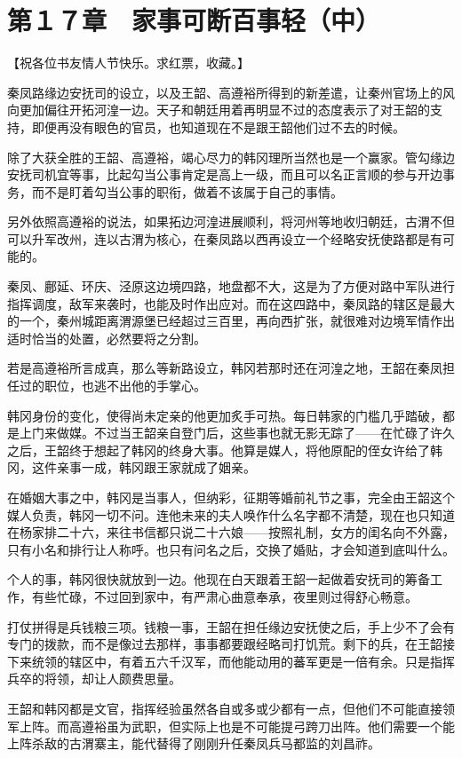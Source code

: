 \section{第１７章　家事可断百事轻（中）}

【祝各位书友情人节快乐。求红票，收藏。】

秦凤路缘边安抚司的设立，以及王韶、高遵裕所得到的新差遣，让秦州官场上的风向更加偏往开拓河湟一边。天子和朝廷用着再明显不过的态度表示了对王韶的支持，即便再没有眼色的官员，也知道现在不是跟王韶他们过不去的时候。

除了大获全胜的王韶、高遵裕，竭心尽力的韩冈理所当然也是一个赢家。管勾缘边安抚司机宜等事，比起勾当公事肯定是高上一级，而且可以名正言顺的参与开边事务，而不是盯着勾当公事的职衔，做着不该属于自己的事情。

另外依照高遵裕的说法，如果拓边河湟进展顺利，将河州等地收归朝廷，古渭不但可以升军改州，连以古渭为核心，在秦凤路以西再设立一个经略安抚使路都是有可能的。

秦凤、鄜延、环庆、泾原这边境四路，地盘都不大，这是为了方便对路中军队进行指挥调度，敌军来袭时，也能及时作出应对。而在这四路中，秦凤路的辖区是最大的一个，秦州城距离渭源堡已经超过三百里，再向西扩张，就很难对边境军情作出适时恰当的处置，必然要将之分割。

若是高遵裕所言成真，那么等新路设立，韩冈若那时还在河湟之地，王韶在秦凤担任过的职位，也逃不出他的手掌心。

韩冈身份的变化，使得尚未定亲的他更加炙手可热。每日韩家的门槛几乎踏破，都是上门来做媒。不过当王韶亲自登门后，这些事也就无影无踪了——在忙碌了许久之后，王韶终于想起了韩冈的终身大事。他算是媒人，将他原配的侄女许给了韩冈，这件亲事一成，韩冈跟王家就成了姻亲。

在婚姻大事之中，韩冈是当事人，但纳彩，征期等婚前礼节之事，完全由王韶这个媒人负责，韩冈一切不问。连他未来的夫人唤作什么名字都不清楚，现在也只知道在杨家排二十六，来往书信都只说二十六娘——按照礼制，女方的闺名向不外露，只有小名和排行让人称呼。也只有问名之后，交换了婚贴，才会知道到底叫什么。

个人的事，韩冈很快就放到一边。他现在白天跟着王韶一起做着安抚司的筹备工作，有些忙碌，不过回到家中，有严肃心曲意奉承，夜里则过得舒心畅意。

打仗拼得是兵钱粮三项。钱粮一事，王韶在担任缘边安抚使之后，手上少不了会有专门的拨款，而不是像过去那样，事事都要跟经略司打饥荒。剩下的兵，在王韶接下来统领的辖区中，有着五六千汉军，而他能动用的蕃军更是一倍有余。只是指挥兵卒的将领，却让人颇费思量。

王韶和韩冈都是文官，指挥经验虽然各自或多或少都有一点，但他们不可能直接领军上阵。而高遵裕虽为武职，但实际上也是不可能提弓跨刀出阵。他们需要一个能上阵杀敌的古渭寨主，能代替得了刚刚升任秦凤兵马都监的刘昌祚。

